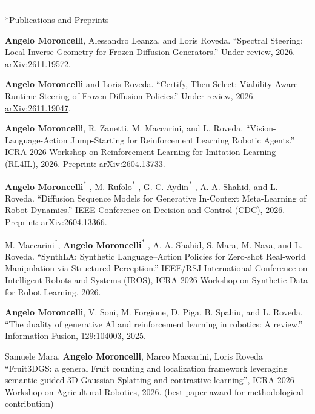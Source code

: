 \documentclass[10pt,a4paper]{article}
\makeatletter
\renewcommand{\section}{\@ifstar\cvsection\cvsection}
\newcommand{\cvsection}[1]{\par\addvspace{9pt}{\large\bfseries #1\par}\nobreak\vspace{4pt}\hrule\nobreak\vspace{5pt}}
\makeatother
\begin{document}
\section*{Publications and Preprints}
\begin{enumerate}[label={[\arabic*]},leftmargin=1.5em,itemsep=4pt,topsep=3pt]
\item \textbf{Angelo Moroncelli}, Alessandro Leanza, and Loris Roveda. “Spectral Steering: Local Inverse Geometry for Frozen Diffusion Generators.” Under review, 2026. \href{https://arxiv.org/abs/2611.19572}{arXiv:2611.19572}.
\item \textbf{Angelo Moroncelli} and Loris Roveda. “Certify, Then Select: Viability-Aware Runtime Steering of Frozen Diffusion Policies.” Under review, 2026. \href{https://arxiv.org/abs/2611.19047}{arXiv:2611.19047}.
\item \textbf{Angelo Moroncelli}, R. Zanetti, M. Maccarini, and L. Roveda. “Vision-Language-Action Jump-Starting for Reinforcement Learning Robotic Agents.” ICRA 2026 Workshop on Reinforcement Learning for Imitation Learning (RL4IL), 2026. Preprint: \href{https://arxiv.org/abs/2604.13733}{arXiv:2604.13733}.
\item \textbf{Angelo Moroncelli}\textsuperscript{*} , M. Rufolo\textsuperscript{*} , G. C. Aydin\textsuperscript{*} , A. A. Shahid, and L. Roveda. “Diffusion Sequence Models for Generative In-Context Meta-Learning of Robot Dynamics.” IEEE Conference on Decision and Control (CDC), 2026. Preprint: \href{https://arxiv.org/abs/2604.13366}{arXiv:2604.13366}.
\item M. Maccarini\textsuperscript{*}, \textbf{Angelo Moroncelli}\textsuperscript{*} , A. A. Shahid, S. Mara, M. Nava, and L. Roveda. “SynthLA: Synthetic Language–Action Policies for Zero-shot Real-world Manipulation via Structured Perception.” IEEE/RSJ International Conference on Intelligent Robots and Systems (IROS), ICRA 2026 Workshop on Synthetic Data for Robot Learning, 2026.
\item \textbf{Angelo Moroncelli}, V. Soni, M. Forgione, D. Piga, B. Spahiu, and L. Roveda. “The duality of generative AI and reinforcement learning in robotics: A review.” Information Fusion, 129:104003, 2025.
\item Samuele Mara, \textbf{Angelo Moroncelli}, Marco Maccarini, Loris Roveda “Fruit3DGS: a general Fruit counting and localization framework leveraging semantic-guided 3D Gaussian Splatting and contrastive learning”, ICRA 2026 Workshop on Agricultural Robotics, 2026. (best paper award for methodological contribution)

\end{enumerate}
\end{document}
